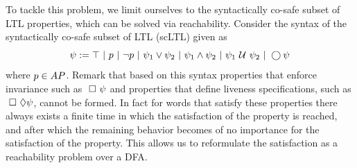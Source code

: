 \documentclass{ifacconf}
\newcommand{\red}[1]{{\color{red} #1}}
\newcommand{\new}[1]{{\color{blue}#1}}
\begin{document}
To tackle this problem, we limit ourselves to the syntactically co-safe subset of LTL properties, which can be solved via reachability.  %
Consider the syntax of the syntactically co-safe subset of LTL (scLTL) given as
    \begin{equation}\label{eq:scLTL}
     \psi :=  \True \ |\ p \ |\ \notltl p \ |\ \psi_1 \vee\psi_2  \ |\ \psi_1 \andltl \psi_2 \ |\ \psi_1 \Until \psi_2 \ |\ \Next \psi
    \end{equation}     where $p\in AP$.
\new{ Remark that based on this syntax properties that enforce invariance such as $\ \square\ \psi$ and properties that define liveness specifications, such as $\ \square\ \lozenge \psi$, cannot be formed.  } \new{In fact for words that satisfy these properties there always exists a finite time in which the satisfaction of the property is reached, and after which the remaining behavior becomes of no importance for the satisfaction of the property.  This allows us to reformulate the satisfaction as a reachability problem over a DFA. %
}
% 
\end{document}
